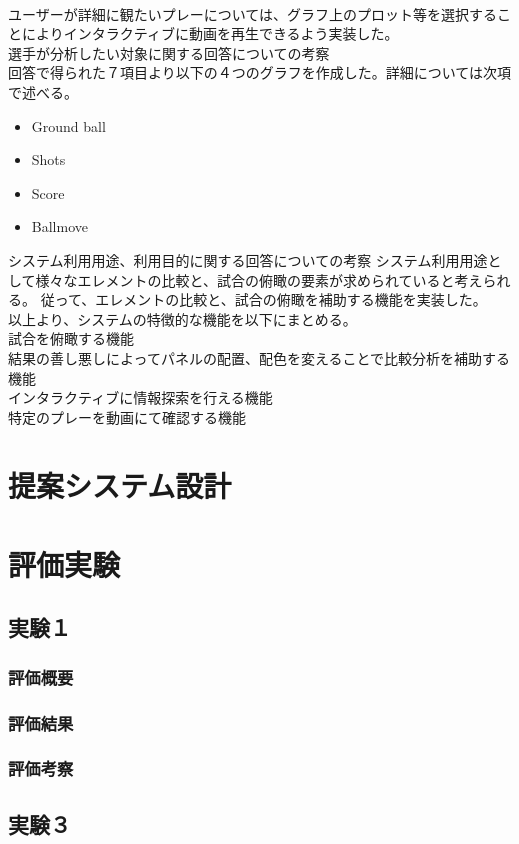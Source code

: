 \documentclass[sotsuron]{kuee}
\begin{document}
\\ユーザーが詳細に観たいプレーについては、グラフ上のプロット等を選択することによりインタラクティブに動画を再生できるよう実装した。
\\選手が分析したい対象に関する回答についての考察
\\回答で得られた７項目より以下の４つのグラフを作成した。詳細については次項で述べる。
\begin{itemize}
\item Ground ball
\item Shots
\item Score
\item Ballmove
\end{itemize}
システム利用用途、利用目的に関する回答についての考察
システム利用用途として様々なエレメントの比較と、試合の俯瞰の要素が求められていると考えられる。
従って、エレメントの比較と、試合の俯瞰を補助する機能を実装した。
\\以上より、システムの特徴的な機能を以下にまとめる。
\\試合を俯瞰する機能
\\結果の善し悪しによってパネルの配置、配色を変えることで比較分析を補助する機能
\\インタラクティブに情報探索を行える機能
\\特定のプレーを動画にて確認する機能

\chapter{提案システム設計}

\chapter{評価実験}
\section{実験１}
\subsection{評価概要}
\subsection{評価結果}
\subsection{評価考察}
\section{実験３}
\end{document}
